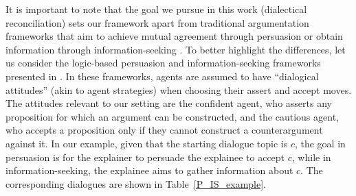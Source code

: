 \documentclass{article}
\begin{document}
It is important to note that the goal we pursue in this work (dialectical reconciliation) sets our framework apart from traditional argumentation frameworks that aim to achieve mutual agreement through persuasion \cite{gordon1994,prakken2006formal,parsons2003properties} or obtain information through information-seeking \cite{parsons2003properties,fan2012agent}. To better highlight the differences, let us consider the %
logic-based persuasion and information-seeking frameworks presented in \cite{parsons2002analysis,parsons2003properties}. In these frameworks, agents are assumed to have ``dialogical attitudes'' (akin to agent strategies) when choosing their assert and accept moves. The attitudes relevant to our setting are the confident agent, who asserts any proposition for which an argument can be constructed, and the cautious agent, who accepts a proposition only if they cannot construct a counterargument against it.
%
In our example, 
given that the starting dialogue topic is $c$, the goal in persuasion is for the explainer to persuade the explainee to accept $c$, while in information-seeking, the explainee aims to gather information about $c$. The %
corresponding dialogues are shown in Table~\ref{P_IS_example}.


\begin{table}[h]
\renewcommand{\arraystretch}{1.2}
\caption{Example of persuasion and information-seeking dialogues.}
\label{P_IS_example}
\end{table}
\end{document}
